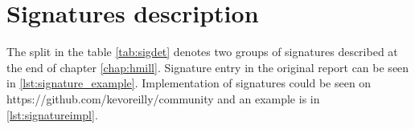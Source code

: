 \chapter{Signatures description} \label{app:signatures}
The split in the table \ref{tab:sigdet} denotes two groups of signatures described at the end of chapter \ref{chap:hmill}.
Signature entry in the original report can be seen in \ref{lst:signature_example}. Implementation of signatures could be seen on https://github.com/kevoreilly/community and an example is in \ref{lst:signatureimpl}.

\newpage

